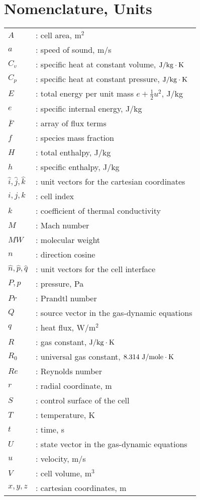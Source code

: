 \documentclass[12pt,a4paper,twoside]{article}
\begin{document}
\section*{Nomenclature, Units}
%
\begin{tabular}{ll}
$A$	& : cell area, m$^2$ \\
$a$	& : speed of sound, m/s \\
$C_v$	& : specific heat at constant volume, $\rm J/kg \cdot K$ \\
$C_p$	& : specific heat at constant pressure, $\rm J/kg \cdot K$ \\
$E$	& : total energy per unit mass $e + \frac{1}{2} u^2$, J/kg \\
$e$	& : specific internal energy, J/kg \\
$\overline{F}$ & : array of flux terms \\
$f$            & : species mass fraction \\
$H$	& : total enthalpy, J/kg \\
$h$            & : specific enthalpy, J/kg \\
$\hat{i}, 
 \hat{j},
 \hat{k}$      & : unit vectors for the cartesian coordinates \\
$i,j,k$	& : cell index \\
$k$            & : coefficient of thermal conductivity \\
$M$	& : Mach number \\
$MW$	& : molecular weight \\
$n$            & : direction cosine \\
$\hat{n}, 
 \hat{p},
 \hat{q}$      & : unit vectors for the cell interface \\
$P, p$	& : pressure, Pa \\
$Pr$	& : Prandtl number \\
$Q$	& : source vector in the gas-dynamic equations \\
$q$     & : heat flux, W/m$^2$ \\
$R$	& : gas constant, $\rm J/kg \cdot K$ \\
$R_0$	& : universal gas constant, $\rm 8.314~J/mole \cdot K$ \\
$Re$	& : Reynolds number \\
$r$            & : radial coordinate, m \\
$S$            & : control surface of the cell \\
$T$	& : temperature, K \\
$t$	& : time, s \\
$U$	& : state vector in the gas-dynamic equations \\
$u$            & : velocity, m/s \\
$V$            & : cell volume, m$^3$ \\
$x, y, z$      & : cartesian coordinates, m \\
\end{tabular}
\end{document}
